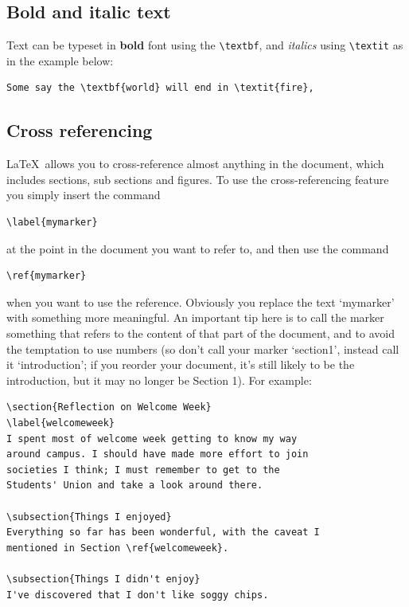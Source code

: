 \subsection{Bold and italic text}
Text can be typeset in \textbf{bold} font using the \verb|\textbf|, and \textit{italics} using \verb|\textit| as in the example below:

\begin{verbatim}
Some say the \textbf{world} will end in \textit{fire},
\end{verbatim}

\subsection{Cross referencing}

\LaTeX\ allows you to cross-reference almost anything in the document, which includes sections, sub sections and figures. To use the cross-referencing feature you simply insert the command 
\begin{verbatim}
\label{mymarker}
\end{verbatim}
at the point in the document you want to refer to, and then use the command

\begin{verbatim}
\ref{mymarker}
\end{verbatim}
when you want to use the reference. Obviously you replace the text `mymarker' with something more meaningful. An important tip here is to call the marker something that refers to the content of that part of the document, and to avoid the temptation to use numbers (so don't call your marker `section1', instead call it `introduction'; if you reorder your document, it's still likely to be the introduction, but it may no longer be Section 1). For example:

\begin{verbatim}
\section{Reflection on Welcome Week}
\label{welcomeweek}
I spent most of welcome week getting to know my way
around campus. I should have made more effort to join
societies I think; I must remember to get to the
Students' Union and take a look around there.

\subsection{Things I enjoyed}
Everything so far has been wonderful, with the caveat I 
mentioned in Section \ref{welcomeweek}.

\subsection{Things I didn't enjoy}
I've discovered that I don't like soggy chips.
\end{verbatim}

